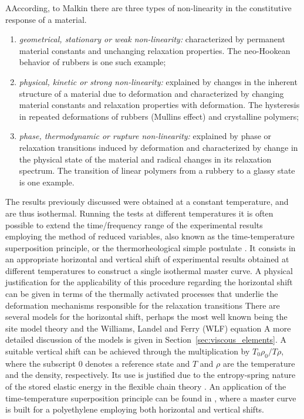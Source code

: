 \begin{remark}
	AAccording, to Malkin \citep{malkinNonlinearityRheologyEssay1995} there are three types of non-linearity in the constitutive response of a material.
	\begin{enumerate}
		\item \textit{geometrical, stationary or weak non-linearity:} characterized by permanent material constants and unchanging relaxation properties. The neo-Hookean behavior of rubbers is one such example;
		\item \textit{physical, kinetic or strong non-linearity:} explained by changes in the inherent structure of a material due to deformation and characterized by changing material constants and relaxation properties with deformation. The hysteresis in repeated deformations of rubbers (Mullins effect) and crystalline polymers;
		\item \textit{phase, thermodynamic or rupture non-linearity:} explained by phase or relaxation transitions induced by deformation and characterized by change in the physical state of the material and radical changes in its relaxation spectrum. The transition of linear polymers from a rubbery to a glassy state is one example.
	\end{enumerate}
\end{remark}

The results previously discussed were obtained at a constant temperature, and are thus isothermal.
Running the tests at different temperatures it is often possible to extend the time/frequency range of the experimental results employing the method of reduced variables, also known as the time-temperature superposition principle, or the thermorheological simple postulate \citep{ferryViscoelasticPropertiesPolymers1980, christensen2013theory}.
It consists in an appropriate horizontal and vertical shift of experimental results obtained at different temperatures to construct a single isothermal master curve.
A physical justification for the applicability of this procedure regarding the horizontal shift can be given in terms of the thermally activated processes that underlie the deformation mechanisms responsible for the relaxation transitions \citep{arzhakovRelaxationPhysicalMechanical2019}
There are several models for the horizontal shift, perhaps the most well known being the site model theory and the Williams, Landel and Ferry (WLF) equation \citep{wardIntroductionMechanicalProperties2004, furmanskiTimeTemperatureEquivalence2013}
A more detailed discussion of the models is given in Section~\ref{sec:viscous_elements}.
A suitable vertical shift can be achieved through the multiplication by $T_0\rho_0/T\rho$, where the subscript 0 denotes a reference state and $T$ and $\rho$ are the temperature and the density, respectively.
Its use is justified due to the entropy-spring nature of the stored elastic energy in the flexible chain theory \citep{ferryViscoelasticPropertiesPolymers1980}.
An application of the time-temperature superposition principle can be found in \cite{popelarViscoelasticMaterialCharacterization1990}, where a master curve is built for a polyethylene employing both horizontal and vertical shifts.

